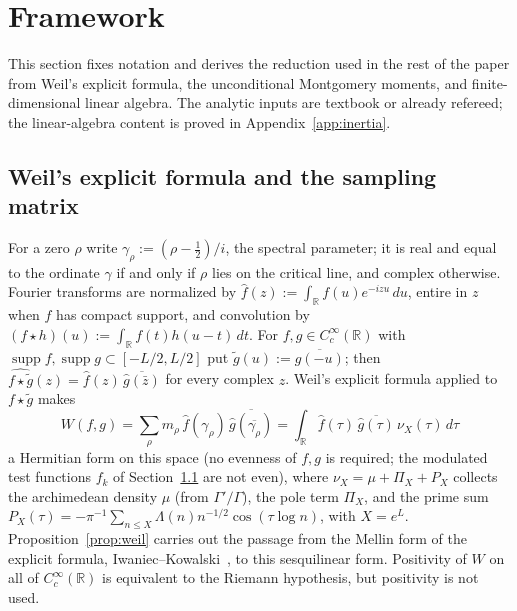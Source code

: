 \documentclass[11pt]{article}
\theoremstyle{definition}
\newcommand{\R}{\mathbb{R}}
\begin{document}
\section{Framework}\label{sec:framework}

This section fixes notation and derives the reduction used in the rest of the paper
from Weil's explicit formula, the unconditional Montgomery
moments, and finite-dimensional linear algebra. The analytic inputs are textbook
or already refereed; the linear-algebra content is proved in
Appendix~\ref{app:inertia}.

\subsection{Weil's explicit formula and the sampling matrix}\label{sec:gabor}
For a zero $\rho$ write $\gamma_\rho:=(\rho-\tfrac12)/i$, the spectral
parameter; it is real and equal to the ordinate $\gamma$ if and only if $\rho$
lies on the critical line, and complex otherwise. Fourier transforms are
normalized by $\widehat f(z):=\int_\R f(u)e^{-izu}\,du$, entire in $z$ when $f$
has compact support, and convolution by
$(f\star h)(u):=\int_\R f(t)h(u-t)\,dt$. For
$f,g\in C^\infty_c(\R)$ with $\operatorname{supp}f,\operatorname{supp}g\subset[-L/2,L/2]$
put $\tilde g(u):=\overline{g(-u)}$; then $\widehat{f\star\tilde g}(z)
=\widehat f(z)\,\overline{\widehat g(\bar z)}$ for every complex $z$. Weil's explicit
formula applied to $f\star\tilde g$ makes
\[
  W(f,g)=\sum_\rho m_\rho\,\widehat f(\gamma_\rho)\,\overline{\widehat g(\overline{\gamma_\rho})}
       =\int_\R \widehat f(\tau)\,\overline{\widehat g(\tau)}\,\nu_X(\tau)\,d\tau
\]
a Hermitian form on this space (no evenness of $f,g$ is required; the
modulated test functions $f_k$ of Section~\ref{sec:gabor} are not even), where
$\nu_X=\mu+\Pi_X+P_X$ collects the archimedean density $\mu$ (from
$\Gamma'/\Gamma$), the pole term $\Pi_X$, and the prime sum
$P_X(\tau)=-\pi^{-1}\sum_{n\le X}\Lambda(n)n^{-1/2}\cos(\tau\log n)$, with $X=e^{L}$.
Proposition~\ref{prop:weil} carries out the passage from the Mellin form of the
explicit formula, Iwaniec--Kowalski~\cite[Theorem~5.11]{IK04}, to this
sesquilinear form. Positivity of $W$ on all of $C^\infty_c(\R)$ is equivalent to
the Riemann hypothesis, but positivity is not used.
\end{document}
